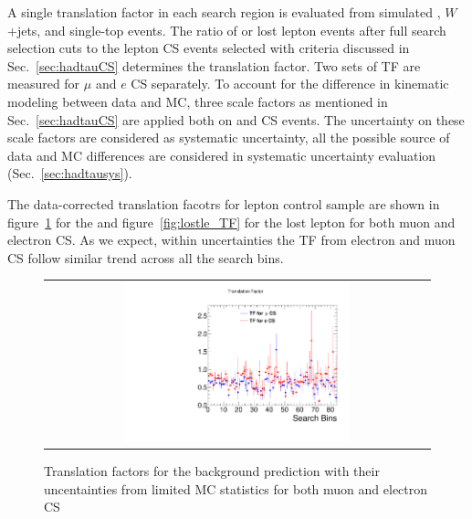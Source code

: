 A single translation factor in each search region is evaluated from simulated \ttbar, $W$+jets, and single-top events. The ratio of \tauh or lost lepton events after full search selection cuts to the lepton CS events selected with criteria discussed in Sec.~\ref{sec:hadtauCS} determines the translation factor. Two sets of TF are measured for $\mu$ and $e$ CS separately. To account for the difference in kinematic modeling between data and MC, three scale factors as mentioned in Sec.~\ref{sec:hadtauCS} are applied both on \tauh and CS events. The uncertainty on these scale factors are considered as systematic uncertainty,
all the possible source of data and MC differences are considered in systematic uncertainty evaluation (Sec.~\ref{sec:hadtausys}). %

The data-corrected translation facotrs for lepton control sample are shown in figure~\ref{fig:hadtau_TF} for the \tauh and figure~\ref{fig:lostle_TF} for the lost lepton for both muon and electron CS. As we expect, within uncertainties the TF from electron and muon CS follow similar trend across all the search bins.

\begin{figure}[htbp]
  \begin{center}
  \begin{tabular}{c}
  \includegraphics[angle=0,width=0.60\textwidth]{sections/mc4/Backgrounds/TF/figures/comp_TF_hadtau_comb.pdf}
  \end{tabular}
  \caption{Translation factors for the \tauh background prediction with their uncentainties from limited MC statistics for both muon and electron CS}
    \label{fig:hadtau_TF}
  \end{center}
\end{figure}


